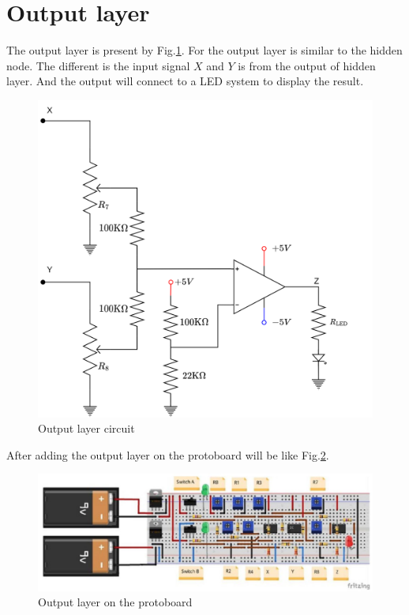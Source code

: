 \documentclass[a4paper, 12pt, AutoFakeBold]{report}
\newcommand{\figref}[1]{Fig.\ref{#1}}
\begin{document}
    \section{Output layer}
    The output layer is present by \figref{fig:Output_layer}. For the output layer is similar to the hidden node. The different is the input signal $X$ and $Y$ is from the output of hidden layer. And the output will connect to a LED system to display the result.
    \begin{figure}[H]
        \centering
        \includegraphics[scale=.2]{figs/Output_layer.png}
        \caption{Output layer circuit}
        \label{fig:Output_layer}
    \end{figure}

    After adding the output layer on the protoboard will be like \figref{fig:Output_layer_onboard}.
    \begin{figure}[H]
        \centering
        \includegraphics[scale=.4]{figs/Output_layer_onboard.JPG}
        \caption{Output layer on the protoboard}
        \label{fig:Output_layer_onboard}
    \end{figure}
\end{document}
